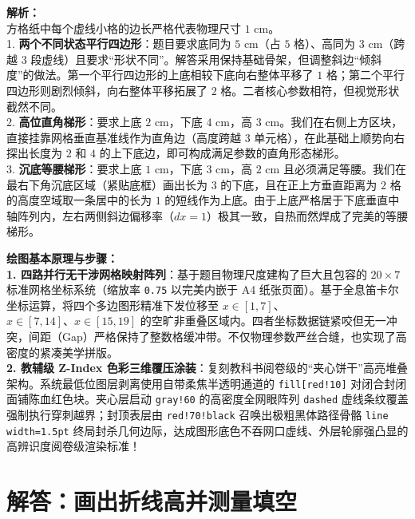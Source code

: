 {\small\color{gray}
\textbf{解析：}\\
方格纸中每个虚线小格的边长严格代表物理尺寸 $1\text{ cm}$。\\
1. \textbf{两个不同状态平行四边形}：题目要求底同为 $5\text{ cm}$（占 $5$ 格）、高同为 $3\text{ cm}$（跨越 $3$ 段虚线）且要求“形状不同”。解答采用保持基础骨架，但调整斜边“倾斜度”的做法。第一个平行四边形的上底相较下底向右整体平移了 $1$ 格；第二个平行四边形则剧烈倾斜，向右整体平移拓展了 $2$ 格。二者核心参数相符，但视觉形状截然不同。\\
2. \textbf{高位直角梯形}：要求上底 $2\text{ cm}$，下底 $4\text{ cm}$，高 $3\text{ cm}$。我们在右侧上方区块，直接挂靠网格垂直基准线作为直角边（高度跨越 $3$ 单元格），在此基础上顺势向右探出长度为 $2$ 和 $4$ 的上下底边，即可构成满足参数的直角形态梯形。\\
3. \textbf{沉底等腰梯形}：要求上底 $1\text{ cm}$，下底 $3\text{ cm}$，高 $2\text{ cm}$ 且必须满足等腰。我们在最右下角沉底区域（紧贴底框）画出长为 $3$ 的下底，且在正上方垂直距离为 $2$ 格的高度空域取一条居中的长为 $1$ 的短线作为上底。由于上底严格居于下底垂直中轴阵列内，左右两侧斜边偏移率（$dx=1$）极其一致，自热而然焊成了完美的等腰梯形。
}

\vspace{0.6cm}

{\small\color{blue!70!black}
\textbf{绘图基本原理与步骤：}\\
\textbf{1. 四路并行无干涉网格映射阵列}：基于题目物理尺度建构了巨大且包容的 $20 \times 7$ 标准网格坐标系统（缩放率 \texttt{0.75} 以完美内嵌于 A4 纸张页面）。基于全息笛卡尔坐标运算，将四个多边图形精准下发位移至 $x \in [1,7]$、$x \in [7,14]、x \in [15,19]$ 的空旷非重叠区域内。四者坐标数据链紧咬但无一冲突，间距（Gap）严格保持了整数格缓冲带。不仅物理参数严丝合缝，也实现了高密度的紧凑美学拼版。\\
\textbf{2. 教辅级 Z-Index 色彩三维覆压涂装}：复刻教科书阅卷级的“夹心饼干”高亮堆叠架构。系统最低位图层剥离使用自带柔焦半透明通道的 \texttt{fill[red!10]} 对闭合封闭面铺陈血红色块。夹心层启动 \texttt{gray!60} 的高密度全网眼阵列 \texttt{dashed} 虚线条纹覆盖强制执行穿刺越界；封顶表层由 \texttt{red!70!black} 召唤出极粗黑体路径骨骼 \texttt{line width=1.5pt} 终局封杀几何边际，达成图形底色不吞网口虚线、外层轮廓强凸显的高辨识度阅卷级渲染标准！
}


\newpage



\section{解答：画出折线高并测量填空}

